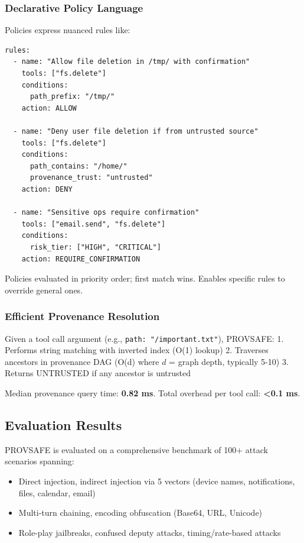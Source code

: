 \subsubsection{Declarative Policy Language}

Policies express nuanced rules like:
\begin{verbatim}
rules:
  - name: "Allow file deletion in /tmp/ with confirmation"
    tools: ["fs.delete"]
    conditions:
      path_prefix: "/tmp/"
    action: ALLOW
  
  - name: "Deny user file deletion if from untrusted source"
    tools: ["fs.delete"]
    conditions:
      path_contains: "/home/"
      provenance_trust: "untrusted"
    action: DENY
  
  - name: "Sensitive ops require confirmation"
    tools: ["email.send", "fs.delete"]
    conditions:
      risk_tier: ["HIGH", "CRITICAL"]
    action: REQUIRE_CONFIRMATION
\end{verbatim}

Policies evaluated in priority order; first match wins. Enables specific rules to override general ones.

\subsubsection{Efficient Provenance Resolution}

Given a tool call argument (e.g., \texttt{path: "/important.txt"}), PROVSAFE:
1. Performs string matching with inverted index (O(1) lookup)
2. Traverses ancestors in provenance DAG (O(d) where $d$ = graph depth, typically 5-10)
3. Returns UNTRUSTED if any ancestor is untrusted

Median provenance query time: \textbf{0.82 ms}. Total overhead per tool call: \textbf{<0.1 ms}.

\subsection{Evaluation Results}

PROVSAFE is evaluated on a comprehensive benchmark of 100+ attack scenarios spanning:
\begin{itemize}[leftmargin=1.2em]
  \item Direct injection, indirect injection via 5 vectors (device names, notifications, files, calendar, email)
  \item Multi-turn chaining, encoding obfuscation (Base64, URL, Unicode)
  \item Role-play jailbreaks, confused deputy attacks, timing/rate-based attacks
\end{itemize}

